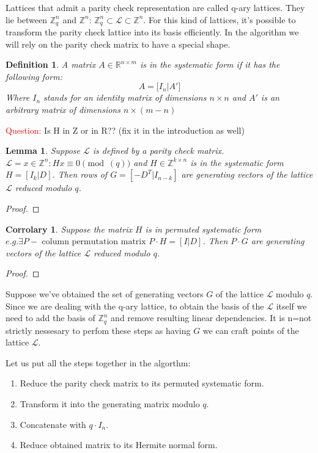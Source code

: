 \documentclass[12pt]{article}
\newcommand{\ZZ}{\mathbb{Z}}
\newcommand{\LL}{\mathcal{L}}
\newtheorem{lemma}{Lemma}
\newtheorem{definition}{Definition}
\newtheorem{corrolary}{Corrolary}
\begin{document}
Lattices that admit a parity check representation are called q-ary lattices. They lie between $\ZZ^{n}_{q}$ and $\ZZ^{n}$: $\ZZ^{n}_{q}  \subset \LL \subset \ZZ^{n}$. For this kind of lattices, it's possible to transform the parity check lattice into its basis efficiently. In the algorithm we will rely on the parity check matrix to have a special shape.
\begin{definition}
A matrix $A \in \mathbb{R}^{n \times m}$ is in the systematic form if it has the following form:
\[
A = \big[ I_{n} | A' \big]
\]
Where $I_{n}$ stands for an identity matrix of dimensions $n \times n$ and $A'$ is an arbitrary matrix of dimensions $n \times (m-n)$
\end{definition}


\textcolor{red}{Question:} Is H in Z or in R?? (fix it in the introduction as well)


\begin{lemma}
Suppose $\LL$ is defined by a parity check matrix. $\LL = {x \in \ZZ^{n}: Hx \equiv 0 \pmod(q)}$ and $H \in \ZZ^{k \times n}$ is in the systematic form $H = [I_{k}| D]$. Then rows of $G = [-D^{T}| I_{n-k}]$ are generating vectors of the lattice $\LL$ reduced modulo $q$.
\end{lemma}
\begin{proof}

\end{proof}

\begin{corrolary}
Suppose the matrix $H$ is in permuted systematic form $e.g. \exists P - \text{ column permutation matrix } P \cdot H = [I | D]$. Then $P \cdot G$ are generating vectors of the lattice $\LL$ reduced modulo $q$.
\end{corrolary}
\begin{proof}

\end{proof}

Suppose we've obtained the set of generating vectors $G$ of the lattice $\LL$ modulo $q$. Since we are dealing with the q-ary lattice, to obtain the basis of the $\LL$ itself we need to add the basis of $\ZZ^{n}_{q}$ and remove resulting linear dependencies. It is n=not strictly nessesary to perfom these steps as having $G$ we can craft points of the lattice $\LL$.



Let us put all the steps together in the algorthm:
\begin{enumerate}
    \item Reduce the parity check matrix to its permuted systematic form.
    \item Transform it into the generating matrix modulo $q$.
    \item Concatenate with $q \cdot I_{n}$.
    \item Reduce obtained matrix to its Hermite normal form.
\end{enumerate}
\end{document}
